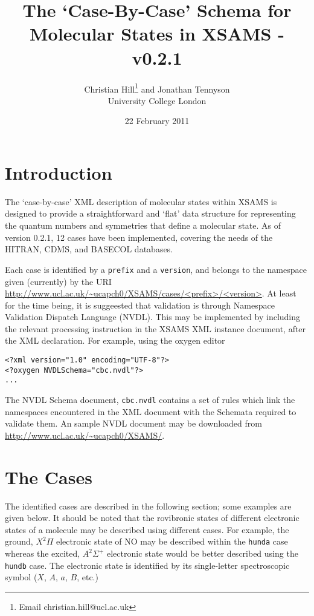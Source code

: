 \documentclass[a4paper]{article} \pagestyle{plain}
\title{The `Case-By-Case' Schema for Molecular States in XSAMS - v0.2.1}
\author{Christian Hill\thanks{Email christian.hill@ucl.ac.uk} and Jonathan Tennyson\\ University College London}
\date{22 February 2011}
\begin{document}
\maketitle
\pagebreak

\section*{Introduction}

The `case-by-case' XML description of molecular states within XSAMS is designed to provide a straightforward and `flat' data structure for representing the quantum numbers and symmetries that define a molecular state. As of version 0.2.1, 12 cases have been implemented, covering the needs of the HITRAN, CDMS, and BASECOL databases.

Each case is identified by a \texttt{prefix} and a \texttt{version}, and belongs to the namespace given (currently) by the URI \url{http://www.ucl.ac.uk/~ucapch0/XSAMS/cases/<prefix>/<version>}. At least for the time being, it is suggeested that validation is through Namespace Validation Dispatch Language (NVDL). This may be implemented by including the relevant processing instruction in the XSAMS XML instance document, after the XML declaration. For example, using the oxygen editor
\begin{verbatim}
<?xml version="1.0" encoding="UTF-8"?>
<?oxygen NVDLSchema="cbc.nvdl"?>
...
\end{verbatim}
The NVDL Schema document, \texttt{cbc.nvdl} contains a set of rules which link the namespaces encountered in the XML document with the Schemata required to validate them. An sample NVDL document may be downloaded from \url{http://www.ucl.ac.uk/~ucapch0/XSAMS/}.

\section*{The Cases}

The identified cases are described in the following section; some examples are given below. It should be noted that the rovibronic states of different electronic states of a molecule may be described using different cases. For example, the ground, $X^2\Pi$ electronic state of $\mathrm{NO}$ may be described within the \texttt{hunda} case whereas the excited, $A^2\Sigma^+$ electronic state would be better described using the \texttt{hundb} case. The electronic state is identified by its single-letter spectroscopic symbol ($X$, $A$, $a$, $B$, etc.)
\end{document}
